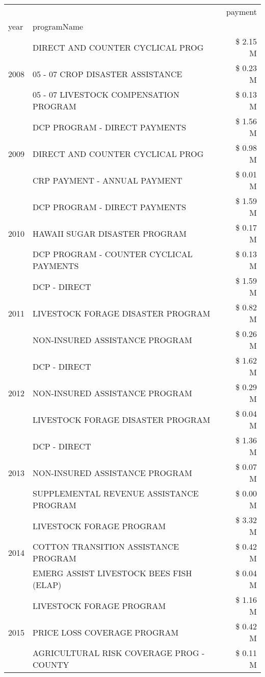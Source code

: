 \begin{tabular}{llr}
\toprule
 &  & payment \\
year & programName &  \\
\midrule
\multirow[t]{3}{*}{2008} & DIRECT AND COUNTER CYCLICAL PROG & \$ 2.15 M \\
 & 05 - 07 CROP DISASTER ASSISTANCE & \$ 0.23 M \\
 & 05 - 07 LIVESTOCK COMPENSATION PROGRAM & \$ 0.13 M \\
\cline{1-3}
\multirow[t]{3}{*}{2009} & DCP PROGRAM - DIRECT PAYMENTS & \$ 1.56 M \\
 & DIRECT AND COUNTER CYCLICAL PROG & \$ 0.98 M \\
 & CRP PAYMENT - ANNUAL PAYMENT & \$ 0.01 M \\
\cline{1-3}
\multirow[t]{3}{*}{2010} & DCP PROGRAM - DIRECT PAYMENTS & \$ 1.59 M \\
 & HAWAII SUGAR DISASTER PROGRAM & \$ 0.17 M \\
 & DCP PROGRAM - COUNTER CYCLICAL PAYMENTS & \$ 0.13 M \\
\cline{1-3}
\multirow[t]{3}{*}{2011} & DCP - DIRECT & \$ 1.59 M \\
 & LIVESTOCK FORAGE DISASTER PROGRAM & \$ 0.82 M \\
 & NON-INSURED ASSISTANCE PROGRAM & \$ 0.26 M \\
\cline{1-3}
\multirow[t]{3}{*}{2012} & DCP - DIRECT & \$ 1.62 M \\
 & NON-INSURED ASSISTANCE PROGRAM & \$ 0.29 M \\
 & LIVESTOCK FORAGE DISASTER PROGRAM & \$ 0.04 M \\
\cline{1-3}
\multirow[t]{3}{*}{2013} & DCP - DIRECT & \$ 1.36 M \\
 & NON-INSURED ASSISTANCE PROGRAM & \$ 0.07 M \\
 & SUPPLEMENTAL REVENUE ASSISTANCE PROGRAM & \$ 0.00 M \\
\cline{1-3}
\multirow[t]{3}{*}{2014} & LIVESTOCK FORAGE PROGRAM & \$ 3.32 M \\
 & COTTON TRANSITION ASSISTANCE PROGRAM & \$ 0.42 M \\
 & EMERG ASSIST LIVESTOCK BEES FISH (ELAP) & \$ 0.04 M \\
\cline{1-3}
\multirow[t]{3}{*}{2015} & LIVESTOCK FORAGE PROGRAM & \$ 1.16 M \\
 & PRICE LOSS COVERAGE PROGRAM & \$ 0.42 M \\
 & AGRICULTURAL RISK COVERAGE PROG - COUNTY & \$ 0.11 M \\

\end{tabular}
